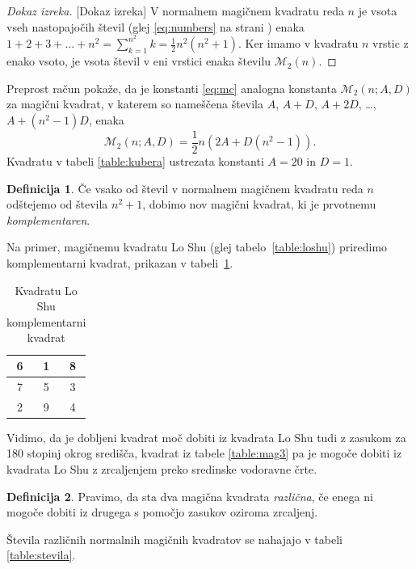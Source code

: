 \documentclass[a4paper,12pt]{article}
\newcommand{\m}{\mathcal{M}_2}
\theoremstyle{definition}
\newtheorem{definicija}{Definicija}
\theoremstyle{plain}
\newcommand{\pojem}[1]{\emph{\color{purple}#1}}
\newenvironment{dokaz}{\begin{proof}[Dokaz izreka]}{\end{proof}}
\newenvironment{magic}[3]{\begin{table}[!ht]
   \centering
   \caption{#2}
   \label{#3}
   \large
   \begin{tabular}{|*{#1}{c|}}
   \hline}{\end{tabular}
   \normalsize
\end{table}}
\begin{document}
\begin{dokaz}[Dokaz izreka]
   V normalnem magičnem kvadratu reda \(n\) je vsota vseh nastopajočih
   števil (glej \eqref{eq:numbers} na strani \pageref{eq:numbers}) enaka
   \(1+2+3+\ldots+n^2=\sum_{k=1}^{n^2}k=\frac{1}{2}n^2(n^2+1)\). Ker imamo
   v kvadratu \(n\) vrstic z enako vsoto, je vsota števil v eni vrstici
   enaka številu \(\m(n)\).
\end{dokaz}

Preprost račun pokaže, da je konstanti \eqref{eq:mc} analogna konstanta
\(\m(n;A,D)\) za magični kvadrat, v katerem so nameščena števila
\(A\), \(A+D\), \(A+2D\), \ldots, \(A+(n^2-1)D\), enaka
\[
   \m(n;A,D) = \frac{1}{2} n \left(2A+D(n^2-1)\right).
\]
Kvadratu v tabeli \ref{table:kubera} ustrezata konstanti \(A=20\) in \(D=1\). %

\begin{definicija}
   Če vsako od števil v normalnem magičnem kvadratu reda \(n\) odštejemo
   od števila \(n^2+1\), dobimo nov magični kvadrat, ki je prvotnemu
   \pojem{komplementaren}.
\end{definicija}

Na primer, magičnemu kvadratu Lo Shu (glej tabelo~\ref{table:loshu}) priredimo
komplementarni kvadrat, prikazan v tabeli~\ref{table:closhu}. %
%
\begin{magic}{3}{Kvadratu Lo Shu komplementarni kvadrat}{table:closhu}
6 & 1 & 8 \\\hline
7 & 5 & 3 \\\hline
2 & 9 & 4 \\\hline
\end{magic}

Vidimo, da je dobljeni kvadrat moč dobiti iz kvadrata Lo Shu tudi z zasukom za
180 stopinj okrog središča, kvadrat iz tabele \ref{table:mag3} pa je mogoče dobiti
iz kvadrata Lo Shu z zrcaljenjem preko sredinske vodoravne črte. %

\begin{definicija}
   Pravimo, da sta dva magična kvadrata \pojem{različna}, če enega ni mogoče dobiti
   iz drugega s pomočjo zasukov oziroma zrcaljenj.
\end{definicija}

Števila različnih normalnih magičnih kvadratov se nahajajo v tabeli \ref{table:stevila}.
\end{document}
